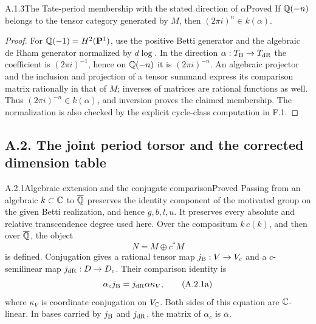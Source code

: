 \begin{result}{A.1.3}{The Tate-period membership with the stated direction of $\alpha$}{Proved}
If $\mathbb Q(-n)$ belongs to the tensor category generated by $M$, then
$(2\pi i)^n\in k(\alpha)$.
\end{result}
\begin{proof}
For $\mathbb Q(-1)=H^2(\mathbf P^1)$, use the positive Betti generator and the
algebraic de Rham generator normalized by $d\log$. In the direction
$\alpha:T_{\mathrm B}\to T_{\mathrm{dR}}$ the coefficient is $(2\pi i)^{-1}$, hence
on $\mathbb Q(-n)$ it is $(2\pi i)^{-n}$. An algebraic projector and the
inclusion and projection of a tensor summand express its comparison
matrix rationally in that of $M$; inverses of matrices are rational
functions as well. Thus $(2\pi i)^{-n}\in k(\alpha)$, and inversion
proves the claimed membership. The normalization is also checked by
the explicit cycle-class computation in F.1.
\end{proof}

\subsection{A.2. The joint period torsor and the corrected dimension table}

\begin{result}{A.2.1}{Algebraic extension and the conjugate comparison}{Proved}
Passing from an algebraic $k\subset\mathbb C$ to $\overline{\mathbb Q}$ preserves the
identity component of the motivated group on the given Betti
realization, and hence $g,b,l,u$. It preserves every absolute and
relative transcendence degree used here. Over the compositum
$k\,c(k)$, and then over $\overline{\mathbb Q}$, the object
\[
                             N=M\oplus c^*M
\]
is defined. Conjugation gives a rational tensor map $j_{\mathrm B}:V\to V_c$
and a $c$-semilinear map $j_{\mathrm{dR}}:D\to D_c$. Their comparison identity is
\[
                   \alpha_c j_{\mathrm B}=j_{\mathrm{dR}}\alpha\kappa_V,
                   \tag{A.2.1a}
\]
where $\kappa_V$ is coordinate conjugation on $V_{\mathbb C}$. Both sides of
this equation are $\mathbb C$-linear. In bases carried by $j_{\mathrm B}$ and
$j_{\mathrm{dR}}$, the matrix of $\alpha_c$ is $\overline\alpha$.
\end{result}

